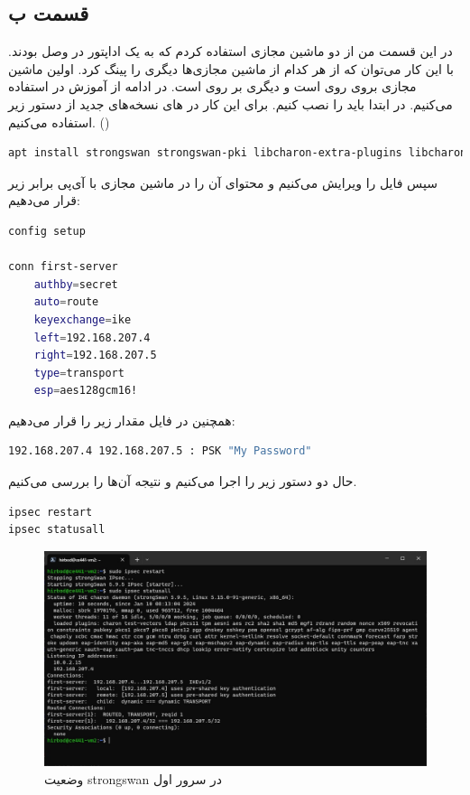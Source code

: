 \documentclass[]{article}
\begin{document}
\subsection*{قسمت ب}
در این قسمت من از دو ماشین مجازی
استفاده کردم که به یک اداپتور
در
وصل بودند. با این کار می‌توان که از هر کدام از ماشین مجازی‌ها دیگری را پینگ کرد. اولین ماشین مجازی بروی روی
 است و دیگری بر روی 
است. در ادامه از آموزش در
استفاده می‌کنیم. در ابتدا باید
را نصب کنیم. برای این کار در
های
نسخه‌های جدید از دستور زیر استفاده می‌کنیم.
()
\begin{latin}
\begin{lstlisting}[language=sh]
apt install strongswan strongswan-pki libcharon-extra-plugins libcharon-extauth-plugins libstrongswan-extra-plugins libtss2-tcti-tabrmd0
\end{lstlisting}
\end{latin}
سپس فایل
را ویرایش می‌کنیم و محتوای آن را در ماشین مجازی با آی‌پی
برابر زیر قرار می‌دهیم:
\begin{latin}
\begin{lstlisting}[language=sh]
config setup

conn first-server
    authby=secret
    auto=route
    keyexchange=ike
    left=192.168.207.4
    right=192.168.207.5
    type=transport
    esp=aes128gcm16!
\end{lstlisting}
\end{latin}
همچنین در فایل
مقدار زیر را قرار می‌دهیم:
\begin{latin}
\begin{lstlisting}[language=sh]
192.168.207.4 192.168.207.5 : PSK "My Password"
\end{lstlisting}
\end{latin}
حال دو دستور زیر را اجرا می‌کنیم و نتیجه آن‌ها را بررسی می‌کنیم.
\begin{latin}
\begin{lstlisting}[language=sh]
ipsec restart
ipsec statusall
\end{lstlisting}
\end{latin}
\begin{figure}[H]
    \centering
    \includegraphics[scale=0.5]{pics/ipsec-stat1.jpg}
    \caption{وضعیت strongswan در سرور اول}
\end{figure}
\end{document}
